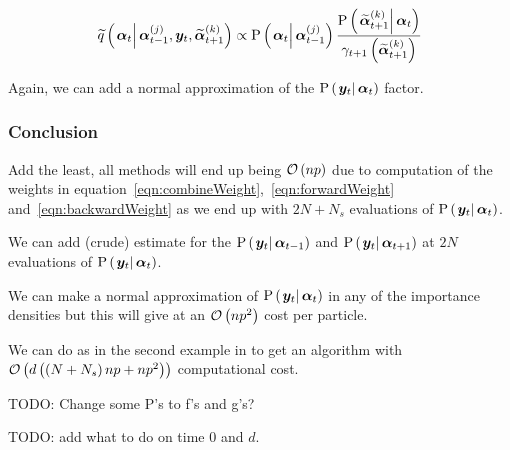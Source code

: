 \begin{equation}
	\IDAproxC{\vec{\alpha}_t}{\partic{\vec{\alpha}}{t-1}{j},\vec{y}_t, \particB{\vec{\alpha}}{t+1}{k}} \propto %
%
	\propC{\vec{\alpha}_t}{\partic{\vec{\alpha}}{t - 1}{j}}
	\frac{
		\propC{\particB{\vec{\alpha}}{t + 1}{k}}{\vec{\alpha}_t}
	}{
		\gamma_{t + 1}\Lparen{\particB{\vec{\alpha}}{t + 1}{k}}
	}
\end{equation}

Again, we can add a normal approximation of the $\propC{\vec{y}_t}{\vec{\alpha}_t}$ factor.

\subsubsection*{Conclusion}
Add the least, all methods will end up being $\mathcal{O}\left( np\right)$ due to computation of the weights in equation~\eqref{eqn:combineWeight},~\eqref{eqn:forwardWeight} and~\eqref{eqn:backwardWeight} as we end up with $2N + N_s$ evaluations of $\propC{\vec{y}_t}{\vec{\alpha}_t}$.

We can add (crude) estimate for the $\propC{\vec{y}_t}{\vec{\alpha}_{t - 1}}$ and $\propC{\vec{y}_t}{\vec{\alpha}_{t + 1}}$ at  $2N$ evaluations of  $\propC{\vec{y}_t}{\vec{\alpha}_t}$.

We can make a normal approximation of  $\propC{\vec{y}_t}{\vec{\alpha}_t}$ in any of the importance densities but this will give at an $\mathcal{O}\left( np^2\right)$ cost per particle.

We can do as in the second example in \citet[page~462 and 463]{fearnhead10} to get an algorithm with $\mathcal{O}\left( d\left( \left( N + N_s\right)np + np^2\right)\right)$ computational cost.

\newpage

TODO: Change some P's to f's and g's?

TODO: add what to do on time 0 and $d$.

